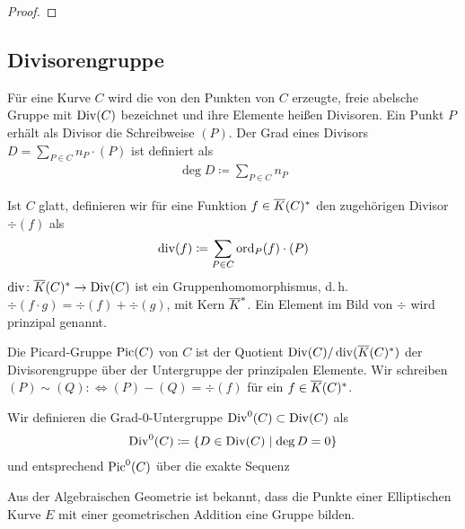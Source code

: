 \begin{Satz}
\begin{proof}
    \end{proof}


\end{Satz}


\subsection{Divisorengruppe}
\begin{Definition}[Divisorengruppe]
  Für eine Kurve $C$ wird die von den Punkten von $C$ erzeugte, freie
  abelsche Gruppe mit $\operatorname{Div}(C)$ bezeichnet und ihre
  Elemente heißen Divisoren. Ein Punkt $P$ erhält als Divisor die
  Schreibweise $(P)$. 
  Der Grad eines Divisors $D=\sum_{P\in C}n_P\cdot(P)$ ist definiert als
  \begin{gather*}
    \deg D \coloneqq \sum_{P\in C} n_P
  \end{gather*}
  
  Ist $C$ glatt, definieren wir für eine Funktion
  $f\in\overline K(C)^*$ den zugehörigen Divisor $\div(f)$
  als
  \begin{gather*}
    \operatorname{div}(f) \coloneqq \sum_{P\in C}\operatorname{ord}_P(f)\cdot(P)
  \end{gather*}
  $\operatorname{div}\colon\overline K(C)^*\to\operatorname{Div}(C)$ ist ein Gruppenhomomorphismus,
  d.\,h. $\div(f\cdot g)=\div(f)+\div(g)$,
  mit Kern $\overline K^*$.
  Ein Element im Bild von $\div$ wird prinzipal genannt.
  
  Die Picard-Gruppe $\operatorname{Pic}(C)$ von $C$ ist der Quotient
  $\operatorname{Div}(C)/\operatorname{div}(\overline K(C)^*)$ der Divisorengruppe über der Untergruppe
  der prinzipalen Elemente. Wir schreiben 
  $(P)\sim(Q):\Leftrightarrow (P)-(Q)=\div(f)$ für ein $f\in\overline K(C)^*$.

  Wir definieren die Grad-0-Untergruppe $\operatorname{Div}^0(C)\subset\operatorname{Div}(C)$ als
  \begin{gather*}
    \operatorname{Div}^0(C) \coloneqq \left\{ D\in\operatorname{Div}(C) \;\middle|\; \deg D=0 \right\}
  \end{gather*}
  und entsprechend $\operatorname{Pic}^0(C)$ über die exakte Sequenz
  \begin{center}
  \end{center}
\end{Definition}

Aus der Algebraischen Geometrie ist bekannt, dass die Punkte einer
Elliptischen Kurve $E$ mit einer geometrischen Addition eine Gruppe
bilden.

